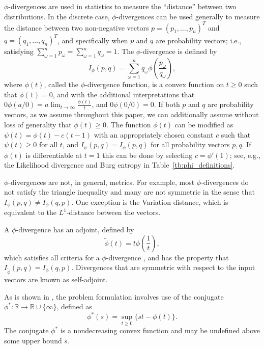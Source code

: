 \documentclass[ijoc,letterpaper]{informs3} %
\newcommand{\R}{{\mathbb{R}}}
\begin{document}
$\phi$-divergences are used in statistics to measure the ``distance'' between two distributions. 
In the discrete case, $\phi$-divergences can be used generally to measure the distance between two non-negative vectors $p = (p_1, \dots, p_n)^T$ and $q = (q_1, \dots, q_n)^T$, and specifically when $p$ and $q$ are probability vectors; i.e., satisfying $\sum_{\omega=1}^n p_\omega = \sum_{\omega=1}^n q_\omega = 1$.
The $\phi$-divergence is defined by
\[
	I_\phi(p,q) = \sum_{\omega=1}^n q_\omega \phi\left(\frac{p_\omega}{q_\omega}\right),
\]
where $\phi(t)$, called the $\phi$-divergence function, is a convex function on $t \geq 0$ such that $\phi(1) = 0$, and with the additional interpretations that $0 \phi(a/0) = a \lim_{t \rightarrow \infty} \frac{\phi(t)}{t}$, and $0 \phi(0/0) = 0$.
If both $p$ and $q$ are probability vectors, as we assume throughout this paper, we can additionally assume without loss of generality that $\phi(t) \geq 0$.
The function $\phi(t)$ can be modified as $\psi(t) = \phi(t) - c(t-1)$ with an appropriately chosen constant $c$ such that $\psi(t) \geq 0$ for all $t$, and $I_\psi(p,q) = I_\phi(p,q)$ for all probability vectors $p,q$.
If $\phi(t)$ is differentiable at $t = 1$ this can be done by selecting $c = \phi'(1)$; see, e.g., the Likelihood divergence and Burg entropy in Table~\ref{tb:phi_definitions}.

$\phi$-divergences are not, in general, metrics.
For example, most $\phi$-divergences do not satisfy the triangle inequality and many are not symmetric in the sense that $I_\phi(p,q) \neq I_\phi(q,p)$.
One exception is the Variation distance, which is equivalent to the $L^1$-distance between the vectors.

A $\phi$-divergence has an adjoint, defined by
\begin{equation} \label{eq:adjoint}
	\tilde{\phi}(t) = t \phi\left(\frac{1}{t}\right),
\end{equation}
which satisfies all criteria for a $\phi$-divergence \citep{bental1991certainty}, and has the property that $I_{\tilde{\phi}}(p,q) = I_\phi(q,p)$.
Divergences that are symmetric with respect to the input vectors are known as self-adjoint.

As is shown in \citep{bental2011robust}, the problem formulation involves use of the conjugate $\phi^* : \R \rightarrow \R \cup \{\infty\}$, defined as
\begin{equation} \label{eq:conjugate}
	\phi^*(s) = \sup_{t \geq 0} \{st - \phi(t)\}.
\end{equation}
The conjugate $\phi^*$ is a nondecreasing convex function and may be undefined above some upper bound $\bar{s}$.
\end{document}
